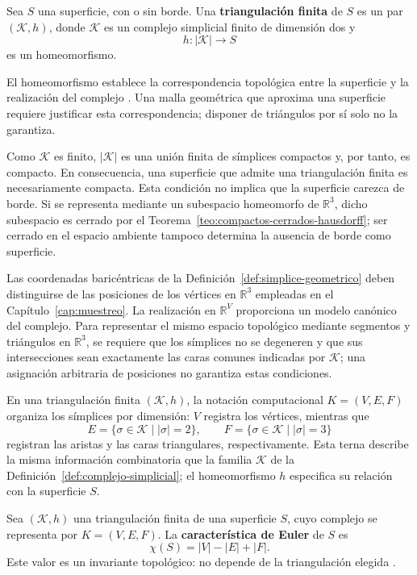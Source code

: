 \begin{definition}
\label{def:triangulacion}
Sea $S$ una superficie, con o sin borde. Una \textbf{triangulación finita} de $S$ es un par $(\mathcal{K},h)$, donde $\mathcal{K}$ es un complejo simplicial finito de dimensión dos y
\[
h:|\mathcal{K}|\longrightarrow S
\]
es un homeomorfismo.
\end{definition}

El homeomorfismo establece la correspondencia topológica entre la superficie y la realización del complejo \cite{minian_complejos_simpliciales_poliedros}. Una malla geométrica que aproxima una superficie requiere justificar esta correspondencia; disponer de triángulos por sí solo no la garantiza.

Como $\mathcal{K}$ es finito, $|\mathcal{K}|$ es una unión finita de símplices compactos y, por tanto, es compacto. En consecuencia, una superficie que admite una triangulación finita es necesariamente compacta. Esta condición no implica que la superficie carezca de borde. Si se representa mediante un subespacio homeomorfo de $\mathbb{R}^3$, dicho subespacio es cerrado por el Teorema~\ref{teo:compactos-cerrados-hausdorff}; ser cerrado en el espacio ambiente tampoco determina la ausencia de borde como superficie.

Las coordenadas baricéntricas de la Definición~\ref{def:simplice-geometrico} deben distinguirse de las posiciones de los vértices en $\mathbb{R}^3$ empleadas en el Capítulo~\ref{cap:muestreo}. La realización en $\mathbb{R}^{V}$ proporciona un modelo canónico del complejo. Para representar el mismo espacio topológico mediante segmentos y triángulos en $\mathbb{R}^3$, se requiere que los símplices no se degeneren y que sus intersecciones sean exactamente las caras comunes indicadas por $\mathcal{K}$; una asignación arbitraria de posiciones no garantiza estas condiciones.

En una triangulación finita $(\mathcal{K},h)$, la notación computacional $K=(V,E,F)$ organiza los símplices por dimensión: $V$ registra los vértices, mientras que
\[
E=\{\sigma\in\mathcal{K}\mid |\sigma|=2\},
\qquad
F=\{\sigma\in\mathcal{K}\mid |\sigma|=3\}
\]
registran las aristas y las caras triangulares, respectivamente. Esta terna describe la misma información combinatoria que la familia $\mathcal{K}$ de la Definición~\ref{def:complejo-simplicial}; el homeomorfismo $h$ especifica su relación con la superficie $S$.

\begin{definition}
\label{def:caracteristica-euler}
Sea $(\mathcal{K},h)$ una triangulación finita de una superficie $S$, cuyo complejo se representa por $K=(V,E,F)$. La \textbf{característica de Euler} de $S$ es
\[
\chi(S)=|V|-|E|+|F|.
\]
Este valor es un invariante topológico: no depende de la triangulación elegida \cite{munkres_topology_2000}.
\end{definition}

